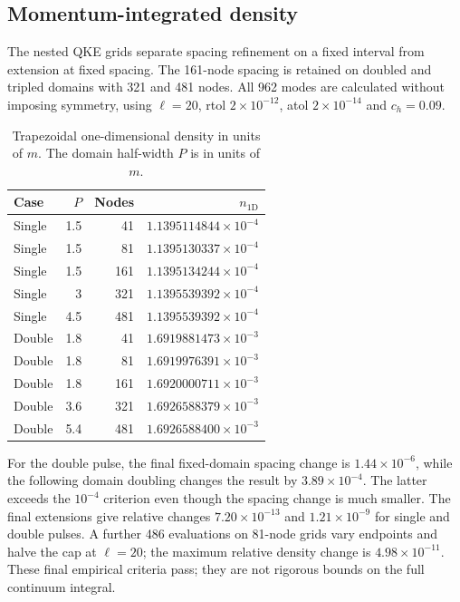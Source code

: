 \documentclass[11pt,a4paper]{article}
\begin{document}
\subsection{Momentum-integrated density}
\label{sec:densityvalidation}
The nested QKE grids separate spacing refinement on a fixed interval from extension at fixed spacing. The 161-node spacing is retained on doubled and tripled domains with 321 and 481 nodes. All 962 modes are calculated without imposing symmetry, using $\ell=20$, rtol $2\times10^{-12}$, atol $2\times10^{-14}$ and $c_h=0.09$.
\begin{table}[htbp]\centering\small
\caption{Trapezoidal one-dimensional density in units of $m$. The domain half-width $P$ is in units of $m$.}\label{tab:density}
\begin{tabular}{lrrr}\toprule
Case & $P$ & Nodes & $n_{1\mathrm D}$\\\midrule
Single & 1.5 & 41 & $1.1395114844\times10^{-4}$\\
Single & 1.5 & 81 & $1.1395130337\times10^{-4}$\\
Single & 1.5 & 161 & $1.1395134244\times10^{-4}$\\
Single & 3 & 321 & $1.1395539392\times10^{-4}$\\
Single & 4.5 & 481 & $1.1395539392\times10^{-4}$\\
Double & 1.8 & 41 & $1.6919881473\times10^{-3}$\\
Double & 1.8 & 81 & $1.6919976391\times10^{-3}$\\
Double & 1.8 & 161 & $1.6920000711\times10^{-3}$\\
Double & 3.6 & 321 & $1.6926588379\times10^{-3}$\\
Double & 5.4 & 481 & $1.6926588400\times10^{-3}$\\
\bottomrule\end{tabular}\end{table}
For the double pulse, the final fixed-domain spacing change is $1.44\times10^{-6}$, while the following domain doubling changes the result by $3.89\times10^{-4}$. The latter exceeds the $10^{-4}$ criterion even though the spacing change is much smaller. The final extensions give relative changes $7.20\times10^{-13}$ and $1.21\times10^{-9}$ for single and double pulses. A further 486 evaluations on 81-node grids vary endpoints and halve the cap at $\ell=20$; the maximum relative density change is $4.98\times10^{-11}$. These final empirical criteria pass; they are not rigorous bounds on the full continuum integral.
\end{document}

